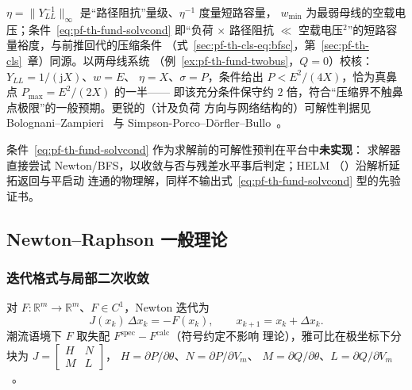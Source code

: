 \begin{remark}[短路容量裕度的读法与两母线校核]\label{rem:pf-th-fund-solvability}
$\eta=\lVert Y_{LL}^{-1}\rVert_\infty$ 是“路径阻抗”量级、$\eta^{-1}$ 度量短路容量，
$w_{\min}$ 为最弱母线的空载电压；条件~\eqref{eq:pf-th-fund-solvcond} 即“负荷 $\times$
路径阻抗 $\ll$ 空载电压$^2$”的短路容量裕度，与前推回代的压缩条件
（式~\eqref{sec:pf-th-cls-eq:bfsc}，第~\ref{sec:pf-th-cls}~章）同源。以两母线系统
（例~\ref{ex:pf-th-fund-twobus}，$Q=0$）校核：$Y_{LL}=1/(\mathrm jX)$、$w=E$、
$\eta=X$、$\sigma=P$，条件给出 $P<E^2/(4X)$，恰为真鼻点 $P_{\max}=E^2/(2X)$ 的一半——
即该充分条件保守约 $2$ 倍，符合“压缩界不触鼻点极限”的一般预期。更锐的（计及负荷
方向与网络结构的）可解性判据见 Bolognani--Zampieri~\cite{pff:bolognani} 与
Simpson-Porco--D\"orfler--Bullo~\cite{pff:simpsonporco}。
\end{remark}

\begin{gapnote}
条件~\eqref{eq:pf-th-fund-solvcond} 作为求解前的可解性预判在平台中\textbf{未实现}：
求解器直接尝试 Newton/BFS，以收敛与否与残差水平事后判定；HELM
（）沿解析延拓返回与平启动
连通的物理解，同样不输出式~\eqref{eq:pf-th-fund-solvcond} 型的先验证书。
\end{gapnote}

\subsection{Newton--Raphson 一般理论}\label{sec:pf-th-fund-newton}

\subsubsection{迭代格式与局部二次收敛}

\begin{definition}[Newton 迭代]\label{def:pf-th-fund-newton}
对 $F:\mathbb R^m\to\mathbb R^m$、$F\in C^1$，Newton 迭代为
\begin{equation}
J(x_k)\,\Delta x_k=-F(x_k),\qquad x_{k+1}=x_k+\Delta x_k .
\label{eq:pf-th-fund-newton-step}
\end{equation}
潮流语境下 $F$ 取失配 $F^{\mathrm{spec}}-F^{\mathrm{calc}}$（符号约定不影响
理论），雅可比在极坐标下分块为
$J=\begin{bmatrix}H&N\\ M&L\end{bmatrix}$，
$H=\partial P/\partial\theta$、$N=\partial P/\partial V_m$、
$M=\partial Q/\partial\theta$、$L=\partial Q/\partial V_m$
~\cite{pff:tinney-hart}。
\end{definition}

